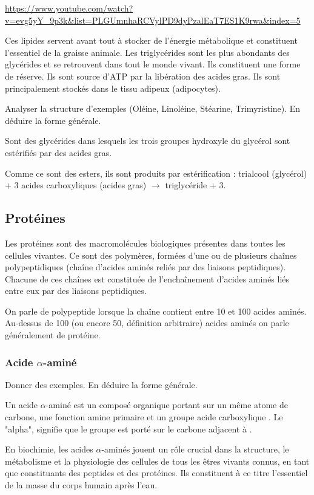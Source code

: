 \documentclass[11pt]{report}
\numberwithin{figure}{section}
\numberwithin{equation}{section}
\numberwithin{table}{section}
\newcommand{\1}{\boldsymbol{1}}
\begin{document}
\url{https://www.youtube.com/watch?v=evg5yY_9p3k&list=PLGUmnhaRCVylPD9dyPzalEaT7ES1K9rwa&index=5}

Ces lipides servent avant tout à stocker de l'énergie métabolique et constituent l'essentiel de la graisse animale. Les triglycérides sont les plus abondants des glycérides et se retrouvent dans tout le monde vivant. Ils constituent une forme de réserve. Ils sont source d’ATP par la libération des acides gras. Ils sont principalement stockés dans le tissu adipeux (adipocytes).

Analyser la structure d'exemples (Oléine, Linoléine, Stéarine, Trimyristine). En déduire la forme générale.

Sont des glycérides dans lesquels les trois groupes hydroxyle du glycérol sont estérifiés par des acides gras. 

Comme ce sont des esters, ils sont produits par estérification : trialcool (glycérol) + 3 acides carboxyliques (acides gras) $\rightarrow$ triglycéride + 3.


\subsection{Protéines}

Les protéines sont des macromolécules biologiques présentes dans toutes les cellules vivantes. Ce sont des polymères, formées d'une ou de plusieurs chaînes polypeptidiques (chaîne d'acides aminés reliés par des liaisons peptidiques). Chacune de ces chaînes est constituée de l'enchaînement d'acides aminés liés entre eux par des liaisons peptidiques.

On parle de polypeptide lorsque la chaîne contient entre 10 et 100 acides aminés. Au-dessus de 100 (ou encore 50, définition arbitraire) acides aminés on parle généralement de protéine.

\subsubsection{Acide $\alpha$-aminé}

Donner des exemples. En déduire la forme générale.

Un acide $\alpha$-aminé est un composé organique portant sur un même atome de carbone, une fonction amine primaire  et un groupe acide carboxylique . Le "alpha", signifie que le groupe  est porté sur le carbone adjacent à .

En biochimie, les acides $\alpha$-aminés jouent un rôle crucial dans la structure, le métabolisme et la physiologie des cellules de tous les êtres vivants connus, en tant que constituants des peptides et des protéines. Ils constituent à ce titre l'essentiel de la masse du corps humain après l'eau.
\end{document}
